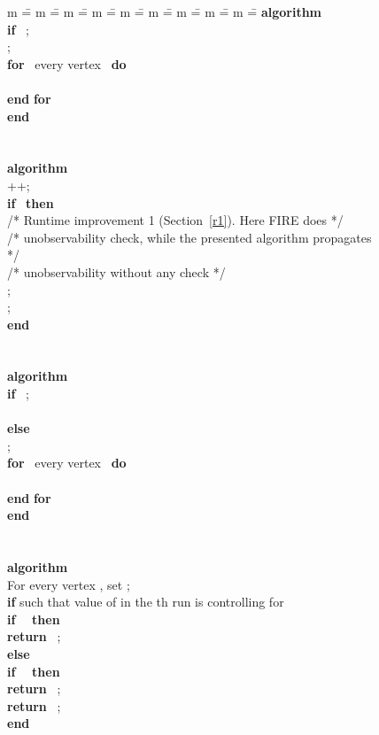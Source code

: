\documentclass[conference]{IEEEtran} \usepackage{times}
\newcommand{\ALGORITHM}{\textbf{algorithm} }
\newcommand{\ELSE}{\textbf{else} }
\newcommand{\END}{\textbf{end} }
\newcommand{\DO}{\textbf{do} }
\newcommand{\FOR}{\textbf{for} }
\newcommand{\IF}{\textbf{if} }
\newcommand{\RETURN}{\textbf{return} }
\newcommand{\THEN}{\textbf{then} }
\begin{document}
\begin{figure}[t!]
\begin{center} 
{\scriptsize
\begin{tabbing} 
m \== m \== m \== m \== m \== m \== m \== m \== m \== \kill
\ALGORITHM  \\ 
\> \IF \ ; \\ \> \> ; \\
\> \> \FOR \ every vertex   \ \DO \\ 
\> \> \>  \\
\> \> \END \FOR  \\
\END \\ \\ \\

\ALGORITHM  \\
\> ++; \\
\> \IF  \ \THEN \\
\> /* Runtime improvement 1 (Section~\ref{r1}). Here FIRE does */\\
\> /* unobservability check, while the presented algorithm propagates */\\
\> /* unobservability without any check */ \\
\> \> ; \\
\> \> ; \\
\END \\ \\ \\

\ALGORITHM  \\ 
\> \IF \ ; \\ \> \>  \\
\> \ELSE \ \\
\> \> ; \\
\> \> \FOR \ every vertex   \ \DO \\ 
\> \> \>  \\
\> \> \END \FOR  \\
\END \\ \\ \\

\ALGORITHM  \\ 
\> For every vertex , set ; \\
\> \IF  such that
value of  in the th run is controlling for  \\ \> \> \IF \  \ \THEN \\
\>  \> \> \RETURN \ ; \\
\> \> \ELSE \\
\> \> \> \IF \  \ \THEN \\
\> \> \> \> \RETURN \ ; \\
\> \RETURN \ ; \\
\END \\ \\ \\


\end{tabbing}}
\end{center}
\end{figure}
\end{document}
